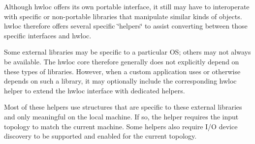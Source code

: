 

Although hwloc offers its own portable interface, it still may have to interoperate with specific or non-\/portable libraries that manipulate similar kinds of objects. hwloc therefore offers several specific \char`\"{}helpers\char`\"{} to assist converting between those specific interfaces and hwloc.

Some external libraries may be specific to a particular OS; others may not always be available. The hwloc core therefore generally does not explicitly depend on these types of libraries. However, when a custom application uses or otherwise depends on such a library, it may optionally include the corresponding hwloc helper to extend the hwloc interface with dedicated helpers.

Most of these helpers use structures that are specific to these external libraries and only meaningful on the local machine. If so, the helper requires the input topology to match the current machine. Some helpers also require I/O device discovery to be supported and enabled for the current topology.



